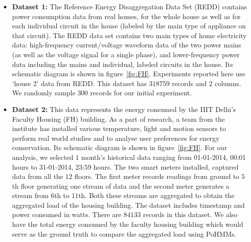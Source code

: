 \documentclass{acm_proc_article-sp}
\begin{document}
\begin{itemize}
\item \textbf{Dataset 1:} The Reference Energy Disaggregation Data Set (REDD) contains power consumption data from real homes, for the whole house as well as for each individual circuit in
the house (labeled by the main type of appliance on that circuit). %
The REDD data set contains two main types of home electricity data: high-frequency current/voltage waveform data of the two power mains (as well as the voltage signal for a single phase), and lower-frequency power data including the mains and individual, labeled circuits in the house. Its schematic diagram is shown in figure~\ref{fig:FH}.
Experiments reported here use `house 2' data from REDD. This dataset has $318759$ records and $2$ columns. We randomly sample $300$ records for our initial experiment.

\item \textbf{Dataset 2:} This data represents the energy consumed by the IIIT Delhi's Faculty Housing (FH) building. As a part of research, a team from the institute has installed various temperature, light and motion sensors to perform real world studies and to analyse user preferences for energy conservation. Its schematic diagram is shown in figure~\ref{fig:FH}. For our analysis, we selected $1$ month's historical data ranging from 01-01-2014, 00:01 hours to 31-01-2014, 23:59 hours. The two smart meters installed, captured data from all the $12$ floors. The first meter records readings from ground to $5$th floor generating one stream of data and the second meter generates a stream from $6$th to $11$th. Both these streams are aggregated to obtain the aggregated load of the housing building. The dataset includes timestamp and power consumed in watts. There are $84133$ records in this dataset. We also have the total energy consumed by the faculty housing building which would serve as the ground truth to compare the aggregated load using PoHMMs. 


\end{itemize}
\end{document}
